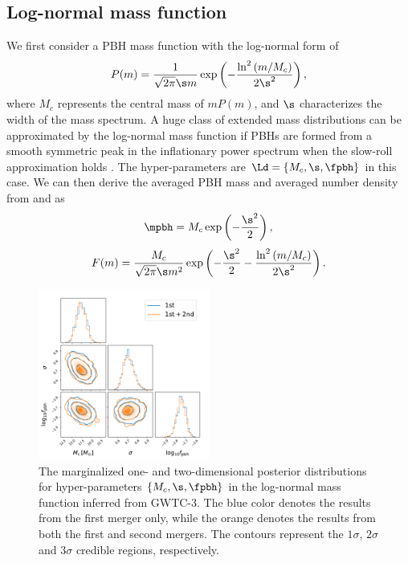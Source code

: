 \documentclass[twocolumn]{aastex631}
\def\({\left(}
\def\){\right)}
\def\e{\begin{equation}}
\def\q{\end{equation}}
\begin{document}
\subsection{Log-normal mass function}
We first consider a PBH mass function with the log-normal form \citep{Dolgov:1992pu} of
\e\label{log}
P(m) = \frac{1}{\sqrt{2\pi} \s m} \exp \(-\frac{\ln^2\(m/M_c\)}{2\s^2}\),
\q
where $M_c$ represents the central mass of $m P(m)$, and $\s$ characterizes the width of the mass spectrum.
A huge class of extended mass distributions can be approximated by the log-normal mass function if PBHs are formed from a smooth symmetric peak in the inflationary power spectrum when the slow-roll approximation holds \citep{Green:2016xgy,Carr:2017jsz,Kannike:2017bxn}.
The hyper-parameters are $\Ld = \{M_c, \s, \fpbh\}$ in this case. 
We can then derive the averaged PBH mass and averaged number density from  and  as
\e
\mpbh = M_c \exp \(-\frac{\s^2}{2}\),
\q
\e 
F(m) = \frac{M_c}{\sqrt{2\pi} \s m^2} \exp \(-\frac{\s^2}{2}-\frac{\ln^2\(m/M_c\)}{2\s^2}\).
\q

\begin{figure}[tbp!]
	\centering
	\includegraphics[width=0.5\textwidth]{post-log.pdf}
	\caption{\label{posterior-log}The marginalized one- and two-dimensional posterior distributions for hyper-parameters $\{M_c, \s, \fpbh\}$ in the log-normal mass function inferred from GWTC-3. The blue color denotes the results from the first merger only, while the orange denotes the results from both the first and second mergers. The contours represent the $1\sigma$, $2\sigma$ and $3\sigma$ credible regions, respectively.}
\end{figure}
\end{document}
